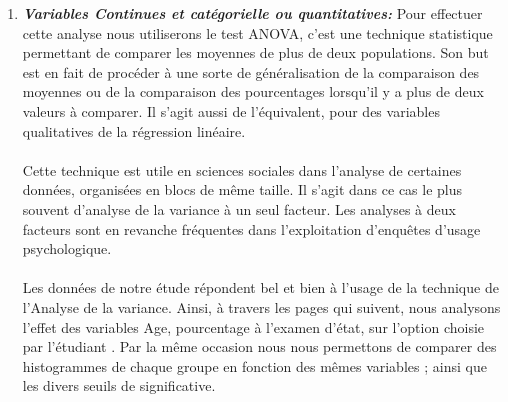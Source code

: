 \begin{enumerate}
	
	\item
	\emph{\textbf{Variables Continues et
			catégorielle ou quantitatives: }}
	Pour effectuer cette analyse nous
	utiliserons le test \ac{ANOVA},
	c'est une technique statistique permettant de comparer les moyennes de plus de deux populations. Son but est en fait de procéder à une sorte de généralisation de la comparaison des moyennes ou de la comparaison des pourcentages lorsqu'il y a plus de deux valeurs à comparer. Il s'agit aussi de l'équivalent, pour des variables qualitatives de la régression linéaire.
	\paragraph{}
	Cette technique est utile en sciences sociales dans l'analyse de certaines données, organisées en blocs de même taille. Il s'agit dans ce cas le plus souvent d'analyse de la variance à un seul facteur. Les analyses à deux facteurs sont en revanche fréquentes dans l'exploitation d'enquêtes d'usage psychologique.
	\paragraph{}
	Les données de notre étude répondent bel et bien à l'usage de la technique de l'Analyse de la variance. Ainsi, à travers les pages qui suivent, nous analysons l'effet des variables  Age, pourcentage à l'examen d'état, sur l'option choisie par l'étudiant . Par la même occasion nous nous permettons de comparer des histogrammes de chaque groupe en fonction des mêmes variables ; ainsi que les divers seuils de significative.

\end{enumerate}
